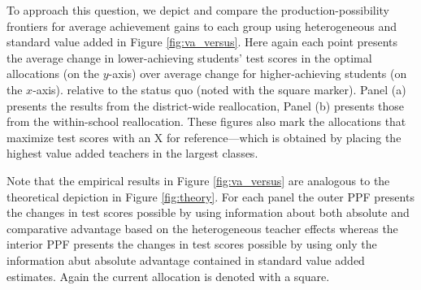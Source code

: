 \documentclass[12pt]{article}
\theoremstyle{definition}
\theoremstyle{definition}
\theoremstyle{definition}
\theoremstyle{definition}
\begin{document}
To approach this question, we depict and compare the production-possibility frontiers for average achievement gains to each group using heterogeneous and standard value added in Figure \ref{fig:va_versus}. Here again each point presents the average change in lower-achieving students' test scores in the optimal allocations (on the $y$-axis) over average change for higher-achieving students (on the $x$-axis). relative to the status quo (noted with the square marker). Panel (a) presents the results from the district-wide reallocation, Panel (b) presents those from the within-school reallocation. These figures also mark the allocations that maximize test scores with an X for reference---which is obtained by placing the highest value added teachers in the largest classes.

Note that the empirical results in Figure \ref{fig:va_versus} are analogous to the theoretical depiction in Figure \ref{fig:theory}. For each panel the outer PPF presents the changes in test scores possible by using information about both absolute and comparative advantage based on the heterogeneous teacher effects whereas the interior PPF presents the changes in test scores possible by using only the information abut absolute advantage contained in standard value added  estimates. Again the current allocation is denoted with a square.
\end{document}
